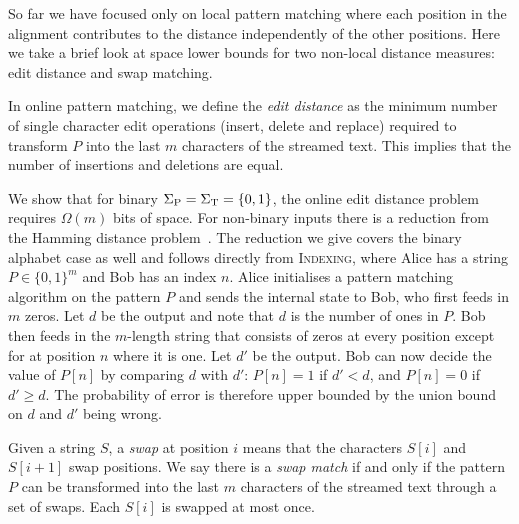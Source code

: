 \documentclass{article}
\renewcommand{\geq}{\geqslant}
\newcommand{\indexing}{\textsc{Indexing}\xspace}
\newcommand{\SigmaP}{\ensuremath{\Sigma_{\textup{P}}}}
\newcommand{\SigmaT}{\ensuremath{\Sigma_{\textup{T}}}}
\theoremstyle{plain}
\theoremstyle{definition}
\begin{document}
So far we have focused only on local pattern matching where each position in the alignment contributes to the distance independently of the other positions. Here we take a brief look at space lower bounds for two non-local distance measures: edit distance and swap matching.

In online pattern matching, we define the \emph{edit distance}  as the minimum number of single character edit operations (insert, delete and replace) required to transform $P$ into the last $m$ characters of the streamed text. This implies that the number of insertions and deletions are equal.

We show that for binary $\SigmaP=\SigmaT=\{0,1\}$, the online edit distance problem requires $\Omega(m)$ bits of space. For non-binary inputs there is a reduction from the Hamming distance problem~\cite{ApproxEdit:04}. The reduction we give covers the binary alphabet case as well and follows directly from \indexing, where Alice has a string $P\in\{0,1\}^m$ and Bob has an index $n$. Alice initialises a pattern matching algorithm on the pattern $P$ and sends the internal state to Bob, who first feeds in $m$ zeros. Let $d$ be the output and note that $d$ is the number of ones in $P$. Bob then feeds in the $m$-length string that consists of zeros at every position except for at position $n$ where it is one. Let $d'$ be the output. Bob can now decide the value of $P[n]$ by comparing $d$ with $d'$: $P[n]=1$ if $d'<d$, and $P[n]=0$ if $d'\geq d$. The probability of error is therefore upper bounded by the union bound on $d$ and $d'$ being wrong.

Given a string $S$, a \emph{swap} at position $i$ means that the characters $S[i]$ and $S[i+1]$ swap positions. We say there is a \emph{swap match} if and only if the pattern $P$ can be transformed into the last $m$ characters of the streamed text through a set of swaps. Each $S[i]$ is swapped at most once.
\end{document}
